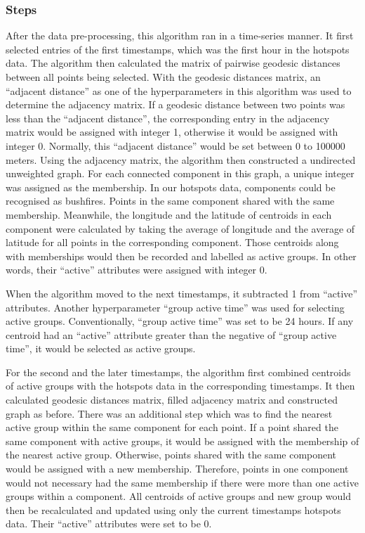 \hypertarget{steps}{%
\subsubsection{Steps}\label{steps}}

After the data pre-processing, this algorithm ran in a time-series
manner. It first selected entries of the first timestamps, which was the
first hour in the hotspots data. The algorithm then calculated the
matrix of pairwise geodesic distances between all points being selected.
With the geodesic distances matrix, an ``adjacent distance'' as one of
the hyperparameters in this algorithm was used to determine the
adjacency matrix. If a geodesic distance between two points was less
than the ``adjacent distance'', the corresponding entry in the adjacency
matrix would be assigned with integer 1, otherwise it would be assigned
with integer 0. Normally, this ``adjacent distance'' would be set
between 0 to 100000 meters. Using the adjacency matrix, the algorithm
then constructed a undirected unweighted graph. For each connected
component in this graph, a unique integer was assigned as the
membership. In our hotspots data, components could be recognised as
bushfires. Points in the same component shared with the same membership.
Meanwhile, the longitude and the latitude of centroids in each component
were calculated by taking the average of longitude and the average of
latitude for all points in the corresponding component. Those centroids
along with memberships would then be recorded and labelled as active
groups. In other words, their ``active'' attributes were assigned with
integer 0.

When the algorithm moved to the next timestamps, it subtracted 1 from
``active'' attributes. Another hyperparameter ``group active time'' was
used for selecting active groups. Conventionally, ``group active time''
was set to be 24 hours. If any centroid had an ``active'' attribute
greater than the negative of ``group active time'', it would be selected
as active groups.

For the second and the later timestamps, the algorithm first combined
centroids of active groups with the hotspots data in the corresponding
timestamps. It then calculated geodesic distances matrix, filled
adjacency matrix and constructed graph as before. There was an
additional step which was to find the nearest active group within the
same component for each point. If a point shared the same component with
active groups, it would be assigned with the membership of the nearest
active group. Otherwise, points shared with the same component would be
assigned with a new membership. Therefore, points in one component would
not necessary had the same membership if there were more than one active
groups within a component. All centroids of active groups and new group
would then be recalculated and updated using only the current timestamps
hotspots data. Their ``active'' attributes were set to be 0.

